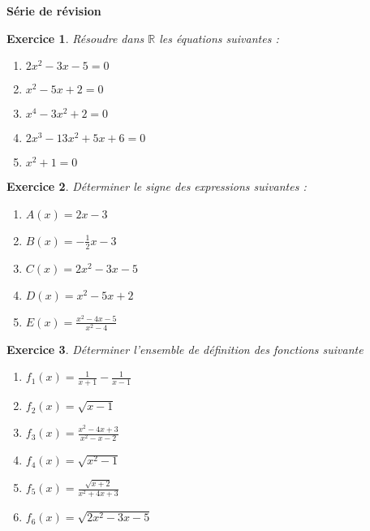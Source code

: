 \documentclass[12pt,a4paper]{article}
\theoremstyle{mystyle}
\newtheorem{exo}{Exercice}
\begin{document}
\pagestyle{fancy}
\fancyhf{} %
\fancyfoot[C]{\thepage} %


\begin{center}
    \textbf{\LARGE Série de révision}
\end{center}
\begin{multicols*}{2}

\begin{exo}
    Résoudre dans $\mathbb{R}$ les équations suivantes :
    \begin{enumerate}
        \item $2x^2 - 3x - 5 = 0$
        \item $x^2 - 5x + 2 = 0$
        \item $x^4 - 3x^2 + 2 = 0$
        \item $2x^3-13x^2+5x+6 = 0$
        \item $x^2+1 = 0$
    \end{enumerate}
\end{exo}

\begin{exo}
    Déterminer le signe des expressions suivantes :
    \begin{enumerate}
        \item $A(x) = 2x - 3$
        \item $B(x) = -\displaystyle\frac{1}{2}x - 3$
        \item $C(x) = 2x^2 - 3x - 5$
        \item $D(x) = x^2 - 5x + 2$
        \item $E(x) = \displaystyle\frac{x^2-4x-5}{x^2-4}$
    \end{enumerate}
\end{exo}

\begin{exo}
    Déterminer l’ensemble de définition des fonctions suivante
    \begin{enumerate}
        \item $f_1(x) = \displaystyle\frac{1}{x+1} - \displaystyle\frac{1}{x-1}$
        \item $f_2(x) = \sqrt{x - 1}$
        \item $f_3(x) = \displaystyle\frac{x^2-4x+3}{x^2-x-2}$
        \item $f_4(x) = \sqrt{x^2-1}$
        \item $f_5(x) = \displaystyle\frac{\sqrt{x+2}}{x^2+4x+3}$
        \item $f_6(x) = \sqrt{2x^2-3x-5}$
    \end{enumerate}
\end{exo}


\end{multicols*}
\end{document}
